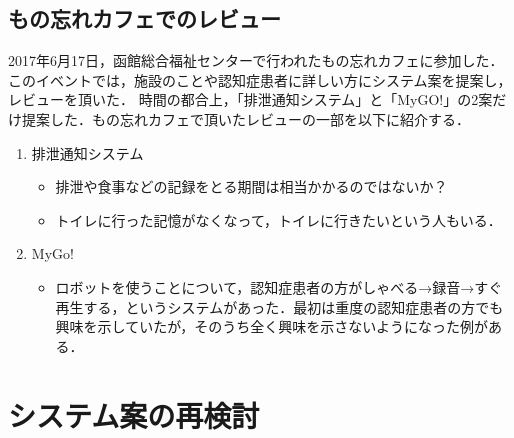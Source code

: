 \documentclass[../report]{subfiles}
\begin{document}
\subsection{もの忘れカフェでのレビュー}
2017年6月17日，函館総合福祉センターで行われたもの忘れカフェに参加した．
このイベントでは，施設のことや認知症患者に詳しい方にシステム案を提案し，レビューを頂いた．
時間の都合上，「排泄通知システム」と「MyGO!」の2案だけ提案した．もの忘れカフェで頂いたレビューの一部を以下に紹介する．
\begin{enumerate}
    \item 排泄通知システム
        \begin{itemize}
            \item 排泄や食事などの記録をとる期間は相当かかるのではないか？
            \item トイレに行った記憶がなくなって，トイレに行きたいという人もいる．
        \end{itemize}
    \item MyGo!
        \begin{itemize}
            \item ロボットを使うことについて，認知症患者の方がしゃべる→録音→すぐ再生する，というシステムがあった．最初は重度の認知症患者の方でも興味を示していたが，そのうち全く興味を示さないようになった例がある．
        \end{itemize}
\end{enumerate}


\section{システム案の再検討}
\end{document}

